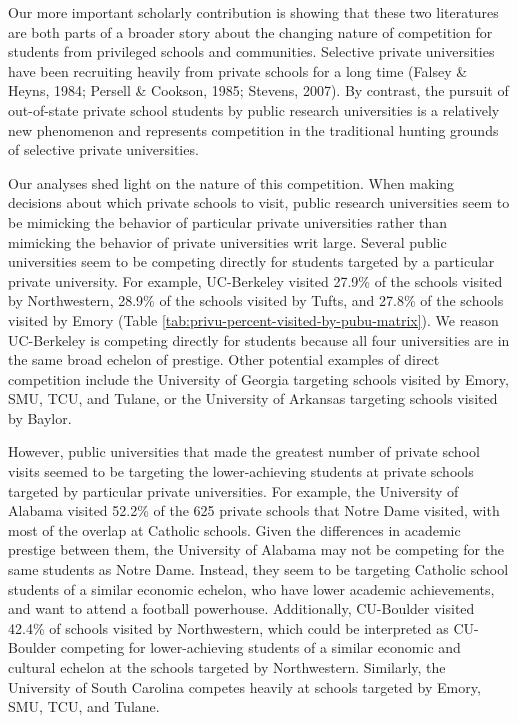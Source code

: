 \documentclass[
  12pt,
]{article}
\begin{document}
Our more important scholarly contribution is showing that these two literatures are both parts of a broader story about the changing nature of competition for students from privileged schools and communities. Selective private universities have been recruiting heavily from private schools for a long time (Falsey \& Heyns, 1984; Persell \& Cookson, 1985; Stevens, 2007). By contrast, the pursuit of out-of-state private school students by public research universities is a relatively new phenomenon and represents competition in the traditional hunting grounds of selective private universities.

Our analyses shed light on the nature of this competition. When making decisions about which private schools to visit, public research universities seem to be mimicking the behavior of particular private universities rather than mimicking the behavior of private universities writ large. Several public universities seem to be competing directly for students targeted by a particular private university. For example, UC-Berkeley visited 27.9\% of the schools visited by Northwestern, 28.9\% of the schools visited by Tufts, and 27.8\% of the schools visited by Emory (Table \ref{tab:privu-percent-visited-by-pubu-matrix}). We reason UC-Berkeley is competing directly for students because all four universities are in the same broad echelon of prestige. Other potential examples of direct competition include the University of Georgia targeting schools visited by Emory, SMU, TCU, and Tulane, or the University of Arkansas targeting schools visited by Baylor.

However, public universities that made the greatest number of private school visits seemed to be targeting the lower-achieving students at private schools targeted by particular private universities. For example, the University of Alabama visited 52.2\% of the 625 private schools that Notre Dame visited, with most of the overlap at Catholic schools. Given the differences in academic prestige between them, the University of Alabama may not be competing for the same students as Notre Dame. Instead, they seem to be targeting Catholic school students of a similar economic echelon, who have lower academic achievements, and want to attend a football powerhouse. Additionally, CU-Boulder visited 42.4\% of schools visited by Northwestern, which could be interpreted as CU-Boulder competing for lower-achieving students of a similar economic and cultural echelon at the schools targeted by Northwestern. Similarly, the University of South Carolina competes heavily at schools targeted by Emory, SMU, TCU, and Tulane.
\end{document}

